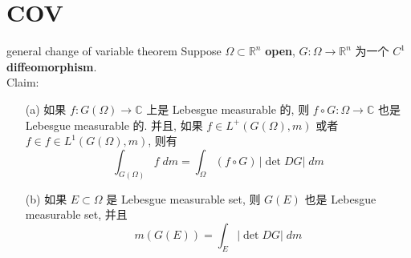 \documentclass[lang=cn,11pt]{elegantbook}
\begin{document}
\section{COV}
\begin{theorem}{general change of variable theorem}
Suppose $\Omega \subset \mathbb{R}^n$ \textbf{open}, $G: \Omega \to \mathbb{R}^n$ 为一个 $C^1$ \textbf{diffeomorphism}.\\
Claim: 
\begin{itemize}
    \item[(a)] 如果 $f:G(\Omega)\to \mathbb{C}$ 上是 Lebesgue measurable 的, 则 $f \circ G:\Omega \to \mathbb{C}$ 也是 Lebesgue measurable 的. 并且, 如果 $f \in L^+(G(\Omega ),m)$ 或者 $f \in f \in L^1(G(\Omega ),m)$, 则有\[ \int _{G(\Omega)}  f\; dm = \int_\Omega (f\circ G) \, |\det DG |\; dm    \]
    \item[(b)]  如果 $E\subset \Omega$ 是 Lebesgue measurable set, 则 $G(E)$ 也是 Lebesgue measurable set, 并且 \[ m(G(E)) = \int_E |\det DG| \; dm  \]
\end{itemize}
\end{theorem}
\end{document}
